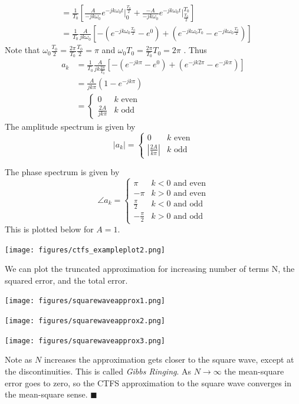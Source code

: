 \begin{example}
\begin{align*}
    &= \frac{1}{T_0} \left[ \frac{A}{-jk\omega_0}e^{-jk\omega_0 t} \Big|_{0}^{\frac{T_0}{2}} + \frac{-A}{-jk\omega_0}e^{-jk\omega_0 t} \Big|_{\frac{T_0}{2}}^{T_0}\right]\\
    &= \frac{1}{T_0} \frac{A}{jk\omega_0} \left[ -\left(e^{-jk\omega_0 \frac{T_0}{2}} - e^{0}\right) + \left(e^{-jk\omega_0 T_0} - e^{-jk\omega_0 \frac{T_0}{2}}\right)\right]
  \end{align*}
  Note that $\omega_0\frac{T_0}{2} = \frac{2\pi}{T_0}\frac{T_0}{2}= \pi$ and $\omega_0 T_0 = \frac{2\pi}{T_0}T_0 = 2\pi$ . Thus
  \begin{align*}
    a_k &= \frac{1}{T_0} \frac{A}{jk\frac{2\pi}{T_0}} \left[ -\left(e^{-jk\pi} - e^{0}\right) + \left(e^{-jk2\pi} - e^{-jk\pi}\right)\right]\\
    &= \frac{A}{jk\pi}\left( 1-e^{-jk\pi}\right) \\
    &= \left\{ \begin{array}{lc}
      0 & k \mbox{ even}\\
      \frac{2A}{jk\pi} & k \mbox{ odd}
    \end{array}
\right.
  \end{align*}
  The amplitude spectrum is given by
  \[
  |a_k| = \left\{ \begin{array}{lc}
    0 & k \mbox{ even}\\
    \left|\frac{2A}{k\pi}\right| & k \mbox{ odd}\end{array}\right.
  \]

  The phase spectrum is given by
  \[
  \angle a_k = \left\{ \begin{array}{lc}
    \pi & k < 0 \mbox{ and even}\\
    -\pi & k > 0 \mbox{ and even}\\
    \frac{\pi}{2} & k < 0 \mbox{ and odd}\\
    -\frac{\pi}{2} & k > 0 \mbox{ and odd}\end{array}\right.
  \]
  This is plotted below for $A = 1$.
  \begin{center}
    \texttt{[image: figures/ctfs\_exampleplot2.png]}
  \end{center}
  We can plot the truncated approximation for increasing number of terms N, the squared error, and the total error.
  \begin{center}
    \texttt{[image: figures/squarewaveapprox1.png]}
  \end{center}
  \begin{center}
    \texttt{[image: figures/squarewaveapprox2.png]}
  \end{center}
  \begin{center}
    \texttt{[image: figures/squarewaveapprox3.png]}
  \end{center}
  Note as $N$ increases the approximation gets closer to the square wave, except at the discontinuities. This is called \emph{Gibbs Ringing}. As $N \rightarrow \infty$ the mean-square error goes to zero, so the CTFS approximation to the square wave converges in the mean-square sense.
  $\blacksquare$
\end{example}



